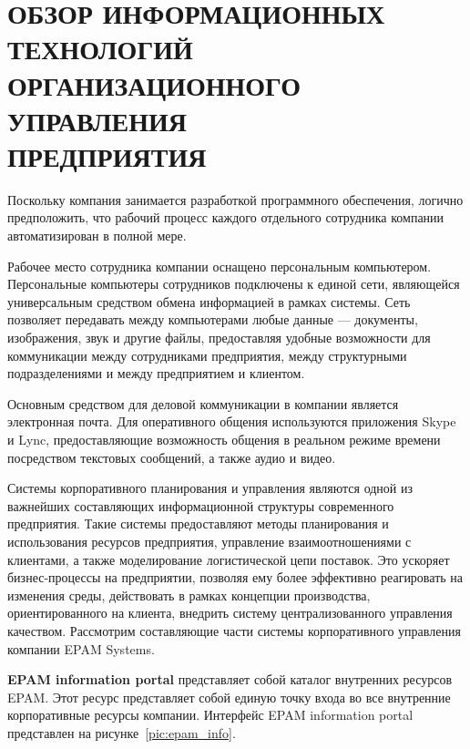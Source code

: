 \section[Обзор информационных технологий \\
  организационного управления предприятия]{%
  ОБЗОР ИНФОРМАЦИОННЫХ ТЕХНОЛОГИЙ \\
  ОРГАНИЗАЦИОННОГО УПРАВЛЕНИЯ \\
  ПРЕДПРИЯТИЯ
}
\label{sec:org_management}

Поскольку компания занимается разработкой программного обеспечения,
логично предположить, что рабочий процесс каждого отдельного сотрудника компании
автоматизирован в полной мере.

Рабочее место сотрудника компании оснащено персональным компьютером.
Персональные компьютеры сотрудников подключены к единой сети, являющейся
универсальным средством обмена информацией в рамках системы.
Сеть позволяет передавать между компьютерами любые данные ---
документы, изображения, звук и другие файлы, предоставляя удобные возможности
для коммуникации между сотрудниками предприятия, между структурными подразделениями
и между предприятием и клиентом.

Основным средством для деловой коммуникации в компании является электронная почта.
Для оперативного общения используются приложения Skype и Lync,
предоставляющие возможность общения в реальном режиме времени
посредством текстовых сообщений, а также аудио и видео.

Системы корпоративного планирования и управления являются одной из
важнейших составляющих информационной структуры современного предприятия.
Такие системы предоставляют методы планирования и использования ресурсов предприятия,
управление взаимоотношениями с клиентами, а также моделирование логистической цепи поставок.
Это ускоряет бизнес-процессы на предприятии, позволяя ему более эффективно реагировать на
изменения среды, действовать в рамках концепции производства, ориентированного на клиента,
внедрить систему централизованного управления качеством.
Рассмотрим составляющие части системы корпоративного управления
компании EPAM Systems.

\textbf{EPAM information portal} представляет собой каталог внутренних ресурсов EPAM.
Этот ресурс представляет собой единую точку входа во все внутренние корпоративные ресурсы
компании.
Интерфейс EPAM information portal представлен на рисунке~\ref{pic:epam_info}.

\pagebreak

